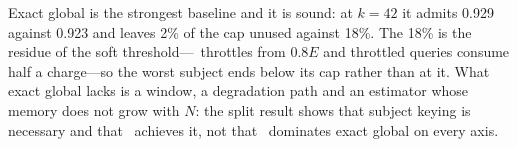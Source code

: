 Exact global is the strongest baseline and it is sound: at $k{=}42$ it admits 0.929
against 0.923 and leaves 2\% of the cap unused against 18\%. The 18\% is the residue
of the soft threshold---\sys\ throttles from $0.8E$ and throttled queries consume half
a charge---so the worst subject ends below its cap rather than at it. What exact global
lacks is a window, a degradation path and an estimator whose memory does not grow with
$N$: the split result shows that subject keying is necessary and that \sys\ achieves
it, not that \sys\ dominates exact global on every axis.

